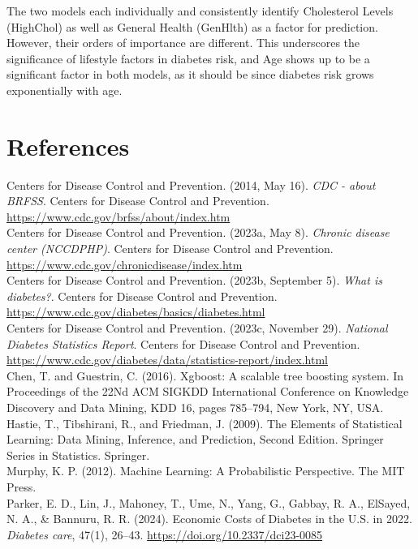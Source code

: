 \documentclass[12pt]{article}
\begin{document}
The two models each individually and consistently identify Cholesterol Levels (HighChol) as well as General Health (GenHlth) as a factor for prediction. However, their orders of importance are different. This underscores the significance of lifestyle factors in diabetes risk, and Age shows up to be a significant factor in both models, as it should be since diabetes risk grows exponentially with age.
\pagebreak

\section{References}
\begin{hangparas}{.25in}{1}
Centers for Disease Control and Prevention. (2014, May 16). \textit{CDC - about BRFSS}. Centers for Disease Control and Prevention. \url{https://www.cdc.gov/brfss/about/index.htm} \\

Centers for Disease Control and Prevention. (2023a, May 8). \textit{Chronic disease center (NCCDPHP)}. Centers for Disease Control and Prevention. \url{https://www.cdc.gov/chronicdisease/index.htm} \\

Centers for Disease Control and Prevention. (2023b, September 5). \textit{What is diabetes?}. Centers for Disease Control and Prevention. \url{https://www.cdc.gov/diabetes/basics/diabetes.html} \\

Centers for Disease Control and Prevention. (2023c, November 29). \textit{National Diabetes Statistics Report}. Centers for Disease Control and Prevention. \url{https://www.cdc.gov/diabetes/data/statistics-report/index.html} \\

Chen, T. and Guestrin, C. (2016). Xgboost: A scalable tree boosting system. In Proceedings of the 22Nd ACM SIGKDD International Conference on Knowledge Discovery and Data Mining, KDD 16, pages 785–794, New York, NY, USA. \\

Hastie, T., Tibshirani, R., and Friedman, J. (2009). The Elements of Statistical Learning: Data Mining, Inference, and Prediction, Second Edition. Springer Series in Statistics. Springer. \\

Murphy, K. P. (2012). Machine Learning: A Probabilistic Perspective. The MIT Press. \\

Parker, E. D., Lin, J., Mahoney, T., Ume, N., Yang, G., Gabbay, R. A., ElSayed, N. A., \& Bannuru, R. R. (2024). Economic Costs of Diabetes in the U.S. in 2022. \textit{Diabetes care}, 47(1), 26–43. \url{https://doi.org/10.2337/dci23-0085} \\
\end{hangparas}
\end{document}
